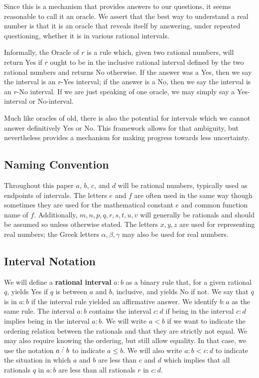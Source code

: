 \documentclass[12pt]{article}
\begin{document}
Since this is a mechanism that provides answers to our questions, it seems reasonable to call it an oracle. We assert that the best way to understand a real number is that it is an oracle that reveals itself by answering, under repeated questioning, whether it is in various rational intervals. 

Informally, the Oracle of $r$ is a rule which, given two rational numbers, will return Yes if $r$ ought to be in the inclusive rational interval defined by the two rational numbers and returns No otherwise. If the answer was a Yes, then we say the interval is an $r$-Yes interval; if the answer is a No, then we say the interval is an $r$-No interval.  If we are just speaking of one oracle, we may simply say a Yes-interval or No-interval. 

Much like oracles of old, there is also the potential for intervals which we cannot answer definitively Yes or No. This framework allows for that ambiguity, but nevertheless provides a mechanism for making progress towards less uncertainty. 

\subsection{Naming Convention}

Throughout this paper $a$, $b$, $c$, and $d$ will be rational numbers, typically used as endpoints of intervals. The letters $e$ and $f$ are often used in the same way though sometimes they are used for the mathematical constant $e$ and common function name of $f$. Additionally,  $m, n, p, q, r, s, t, u, v$ will generally be rationals and should be assumed so unless otherwise stated. The letters $x, y, z$ are used for representing real numbers; the Greek letters $\alpha, \beta, \gamma$ may also be used for real numbers. 

\subsection{Interval Notation}

We will define a \textbf{rational interval} $a:b$ as a binary rule that, for a given rational $q$, yields Yes if $q$ is between $a$ and $b$, inclusive, and yields No if not. We say that $q$ is in $a:b$ if the interval rule yielded an affirmative answer.  We identify $b:a$ as the same rule. The interval $a:b$ contains the interval $c:d$ if being in the interval $c:d$ implies being in the interval $a:b$. We will write $a\lt b$ if we want to indicate the ordering relation between the rationals and that they are strictly not equal. We may also require knowing the ordering, but still allow equality. In that case, we use the notation $a \lte b$ to indicate $a \leq b$.  We will also write $a:b < c:d$ to indicate the situation in which $a$ and $b$ are less than $c$ and $d$ which implies that all rationals $q$ in $a:b$ are less than all rationals $r$ in $c:d$. 
\end{document}
